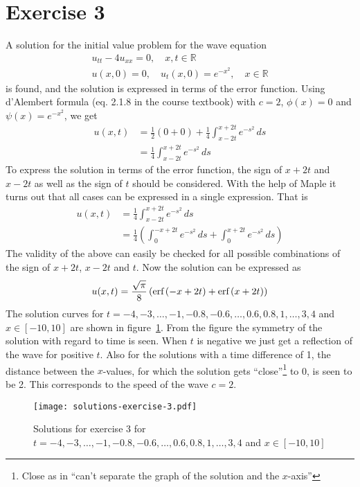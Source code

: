 \documentclass[11pt]{article}
\newcommand\myreal{\mathbb{R}}
\newcommand\erf{\text{erf\,}}
\begin{document}
\section*{Exercise 3}
A solution for the initial value problem for the wave equation
\begin{gather*}
    u_{tt} - 4u_{xx} = 0,\quad x,t\in\myreal \\
    u(x, 0) = 0,\quad u_t(x, 0)=e^{-x^2}, \quad x\in\myreal
\end{gather*}
is found, and the solution is expressed in terms of the error function. Using d'Alembert formula (eq. 2.1.8 in the course textbook) with $c=2$, $\phi(x)=0$ and $\psi(x)=e^{-x^2}$, we get
\begin{align*}
    u(x, t) &= \frac{1}{2}(0+0)+\frac{1}{4}\int_{x-2t}^{x+2t}e^{-s^2}\,ds \\
    &= \frac{1}{4}\int_{x-2t}^{x+2t}e^{-s^2}\,ds
\end{align*}
To express the solution in terms of the error function, the sign of $x+2t$ and $x-2t$ as well as the sign of $t$ should be considered. With the help of Maple it turns out that all cases can be expressed in a single expression. That is
\begin{align*}
    u(x, t) &= \frac{1}{4}\int_{x-2t}^{x+2t}e^{-s^2}\,ds \\
    &= \frac{1}{4}\left(\int_{0}^{-x+2t}e^{-s^2}\,ds + \int_{0}^{x+2t}e^{-s^2}\,ds\right)
\end{align*}
The validity of the above can easily be checked for all possible combinations of the sign of $x+2t$, $x-2t$ and $t$. Now the solution can be expressed as
\begin{align*}
    u(x, t) = \frac{\sqrt{\pi}}{8}\left(\erf(-x+2t) + \erf(x+2t)\right)
\end{align*}
The solution curves for $t=-4,-3,\dots,-1,-0.8,-0.6,\dots,0.6,0.8,1,\dots,3,4$ and $x\in[-10, 10]$ are shown in figure~\ref{fig:ex3-solutions}. From the figure the symmetry of the solution with regard to time is seen. When $t$ is negative we just get a reflection of the wave for positive $t$. Also for the solutions with a time difference of 1, the distance between the $x$-values, for which the solution gets ``close''\footnote{Close as in ``can't separate the graph of the solution and the $x$-axis''} to 0, is seen to be 2. This corresponds to the speed of the wave $c=2$.
\begin{figure}
    \centering
    \texttt{[image: solutions-exercise-3.pdf]}
    \caption{Solutions for exercise 3 for $t=-4,-3,\dots,-1,-0.8,-0.6,\dots,0.6,0.8,1,\dots,3,4$ and $x\in[-10,10]$}\label{fig:ex3-solutions}
\end{figure}
\end{document}
